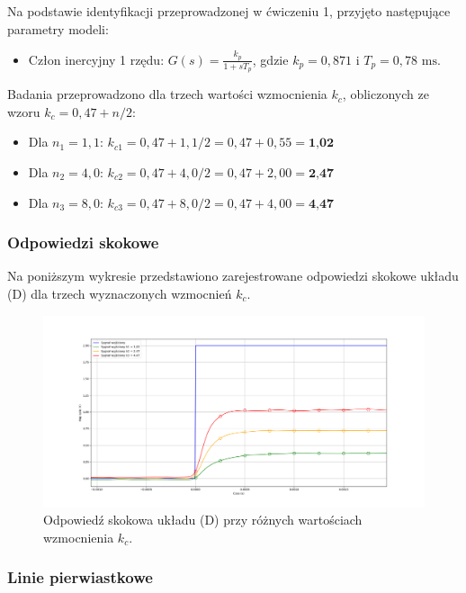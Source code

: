 \documentclass[12pt,a4paper]{article}
\begin{document}
	Na podstawie identyfikacji przeprowadzonej w ćwiczeniu 1, przyjęto następujące parametry modeli:
	\begin{itemize}
		\item Człon inercyjny 1 rzędu: $G(s) = \frac{k_p}{1+sT_p}$, gdzie $k_p = 0,871$ i $T_p = 0,78 \text{ ms}$.
	\end{itemize}
	
	Badania przeprowadzono dla trzech wartości wzmocnienia \(k_c\), obliczonych ze wzoru \(k_c = 0,47 + n/2\):
	\begin{itemize}
		\item Dla \(n_1 = 1,1\): $k_{c1} = 0,47 + 1,1 / 2 = 0,47 + 0,55 = \textbf{1,02}$
		\item Dla \(n_2 = 4,0\): $k_{c2} = 0,47 + 4,0 / 2 = 0,47 + 2,00 = \textbf{2,47}$
		\item Dla \(n_3 = 8,0\): $k_{c3} = 0,47 + 8,0 / 2 = 0,47 + 4,00 = \textbf{4,47}$
	\end{itemize}
	
	\subsubsection{Odpowiedzi skokowe}
	Na poniższym wykresie przedstawiono zarejestrowane odpowiedzi skokowe układu (D) dla trzech wyznaczonych wzmocnień \(k_c\).
	
	\begin{figure}[H]
	\centering
	\includegraphics[width=1\linewidth]{zdjecia/OdpSkokD.png}
	\caption{Odpowiedź skokowa układu (D) przy różnych wartościach wzmocnienia \(k_c\).}
	\label{fig:OdpSkokD}
	\end{figure}
	
	
	\subsubsection{Linie pierwiastkowe}
	
\end{document}
